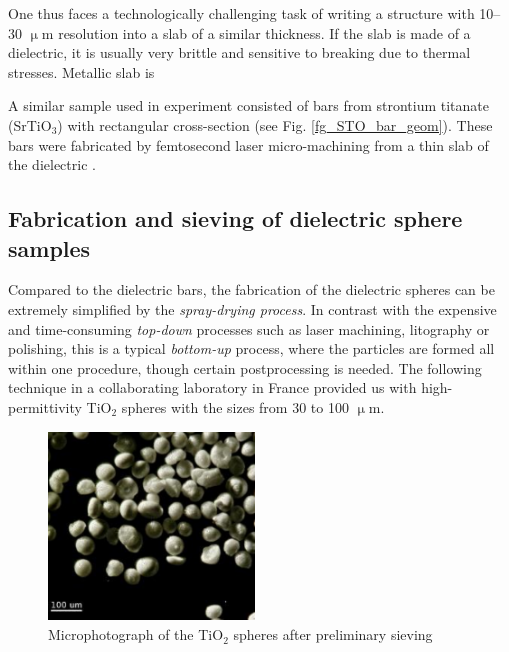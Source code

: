 One thus faces a technologically challenging task of writing a structure with 10--30 $\upmu$m resolution into a slab of a similar thickness. If the slab is made of a dielectric, it is usually very brittle and sensitive to breaking due to thermal stresses. Metallic slab is  

A similar sample used in experiment consisted of bars from strontium titanate (SrTiO$_{3}$) with  rectangular cross-section (see Fig. \ref{fg_STO_bar_geom}). These bars were fabricated by femtosecond laser micro-machining from a thin slab of the dielectric \cite{yahiaoui2011tunable}.
\subsection{Fabrication and sieving of dielectric sphere samples}
Compared to the dielectric bars, the fabrication of the dielectric spheres can be extremely simplified by the \textit{spray-drying process}. In contrast with the expensive and time-consuming \textit{top-down} processes such as laser machining, litography or polishing, this is a typical \textit{bottom-up} process, where the particles are formed all within one procedure, though certain postprocessing is needed. The following technique in a collaborating laboratory in France %
provided us with high-permittivity TiO$_{2}$ spheres with the sizes from 30 to 100 $\upmu$m. 

\begin{figure}[ht] \caption{Microphotograph of the TiO$_{2}$ spheres after preliminary sieving} \label{fg_microphoto} \centering 
\includegraphics[height=5cm]{img/microscope_TiO2_particles.pdf}
\end{figure}
